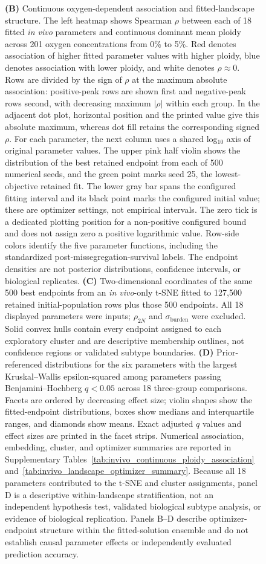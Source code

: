 \documentclass[11pt]{article}
\begin{document}
\begin{figure}[!htbp]
{\textbf{(B)} Continuous oxygen-dependent association and fitted-landscape structure. The left heatmap shows Spearman \(\rho\) between each of 18 fitted \textit{in vivo} parameters and continuous dominant mean ploidy across 201 oxygen concentrations from 0\% to 5\%. Red denotes association of higher fitted parameter values with higher ploidy, blue denotes association with lower ploidy, and white denotes \(\rho\approx0\). Rows are divided by the sign of \(\rho\) at the maximum absolute association: positive-peak rows are shown first and negative-peak rows second, with decreasing maximum \(|\rho|\) within each group. In the adjacent dot plot, horizontal position and the printed value give this absolute maximum, whereas dot fill retains the corresponding signed \(\rho\). For each parameter, the next column uses a shared log$_{10}$ axis of original parameter values. The upper pink half violin shows the distribution of the best retained endpoint from each of 500 numerical seeds, and the green point marks seed 25, the lowest-objective retained fit. The lower gray bar spans the configured fitting interval and its black point marks the configured initial value; these are optimizer settings, not empirical intervals. The zero tick is a dedicated plotting position for a non-positive configured bound and does not assign zero a positive logarithmic value. Row-side colors identify the five parameter functions, including the standardized post-missegregation-survival labels. The endpoint densities are not posterior distributions, confidence intervals, or biological replicates. \textbf{(C)} Two-dimensional coordinates of the same 500 best endpoints from an \textit{in vivo}-only t-SNE fitted to 127,500 retained initial-population rows plus those 500 endpoints. All 18 displayed parameters were inputs; \(\rho_{2N}\) and \(\sigma_{\mathrm{burden}}\) were excluded. Solid convex hulls contain every endpoint assigned to each exploratory cluster and are descriptive membership outlines, not confidence regions or validated subtype boundaries. \textbf{(D)} Prior-referenced distributions for the six parameters with the largest Kruskal--Wallis epsilon-squared among parameters passing Benjamini--Hochberg \(q<0.05\) across 18 three-group comparisons. Facets are ordered by decreasing effect size; violin shapes show the fitted-endpoint distributions, boxes show medians and interquartile ranges, and diamonds show means. Exact adjusted \(q\) values and effect sizes are printed in the facet strips. Numerical association, embedding, cluster, and optimizer summaries are reported in Supplementary Tables~\ref{tab:invivo_continuous_ploidy_association} and~\ref{tab:invivo_landscape_optimizer_summary}. Because all 18 parameters contributed to the t-SNE and cluster assignments, panel D is a descriptive within-landscape stratification, not an independent hypothesis test, validated biological subtype analysis, or evidence of biological replication. Panels B--D describe optimizer-endpoint structure within the fitted-solution ensemble and do not establish causal parameter effects or independently evaluated prediction accuracy.}
\label{fig:iteration1-invivo-resource-regimes-landscape}
\end{figure}
\end{document}
